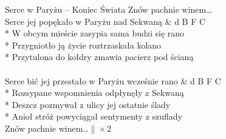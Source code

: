 \begin{piosenka_dluga}{Serce w Paryżu -- Koniec Świata}
 Znów pachnie winem\ldots \\[\zwrotkaspace]

Serce jej popękało w Paryżu nad Sekwaną & d B F C \\*
W obcym mieście zasypia sama budzi się rano \\*
Przygniotło ją życie roztrzaskała kolano \\*
Przytulona do kołdry zmawia pacierz pod ścianą \\[\zwrotkaspace]

 \\[\zwrotkaspace]

Serce bić jej przestało w Paryżu wcześnie rano & d B F C \\*
Rozsypane wspomnienia odpłynęły z Sekwaną \\*
Deszcz pozmywał z ulicy jej ostatnie ślady \\*
Anioł stróż powyciągał sentymenty z szuflady \\[\zwrotkaspace]

 Znów pachnie winem\ldots $\| \times 2$ \\[\zwrotkaspace]

\end{piosenka_dluga}